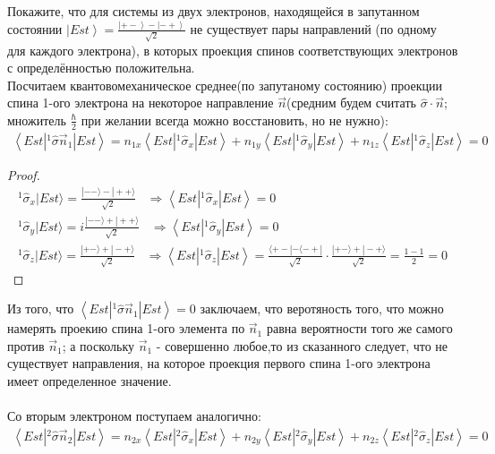 \documentclass[__main__.tex]{subfiles}
\begin{document}
	
	Покажите, что для системы из двух электронов, находящейся в запутанном состоянии $\left|Est\right>=\frac{\left|+-\right>-\left|-+\right>}{\sqrt{2}}$ не существует пары направлений (по одному для каждого электрона), в которых проекция спинов соответствующих электронов с определённостью положительна.\\
	
	Посчитаем квантовомеханическое среднее(по запутаному состоянию) проекции спина 1-ого электрона на некоторое направление $\vec{n}$(средним будем считать $\hat{\sigma}\cdot\vec{n}$; множитель $\frac{\hbar}{2}$ при желании всегда можно восстановить, но не нужно):
	\begin{gather*}
		\left<Est|^1\hat{\sigma}\vec{n}_1|Est\right> = 
			n_{1x}\left<Est|^1\hat{\sigma}_x|Est\right>+
			n_{1y}\left<Est|^1\hat{\sigma}_y|Est\right>+
			n_{1z}\left<Est|^1\hat{\sigma}_z|Est\right> = 0
	\end{gather*}
	\begin{proof}
		\begin{gather*}
			^1\hat{\sigma}_x|Est\rangle = \frac{|--\rangle-|++\rangle}{\sqrt{2}}\;\;\;\Rightarrow \left<Est|^1\hat{\sigma}_x|Est\right> = 0\\
			^1\hat{\sigma}_y|Est\rangle = i\frac{|--\rangle+|++\rangle}{\sqrt{2}}\;\;\;\Rightarrow \left<Est|^1\hat{\sigma}_y|Est\right> = 0\\
			^1\hat{\sigma}_z|Est\rangle = \frac{|+-\rangle+|-+\rangle}{\sqrt{2}}\;\;\;\Rightarrow \left<Est|^1\hat{\sigma}_z|Est\right> = \frac{\langle+-|-\langle-+|}{\sqrt{2}}\cdot \frac{|+-\rangle+|-+\rangle}{\sqrt{2}} = \frac{1-1}{2} =  0
		\end{gather*}
	\end{proof}
	Из того, что $\left<Est|^1\hat{\sigma}\vec{n}_1|Est\right> = 0$ заключаем, что веротяность того, что можно намерять проекию спина 1-ого элемента по $\vec{n}_1$ равна вероятности того же самого против $\vec{n}_1$; а поскольку $\vec{n}_1$ - совершенно любое,то из сказанного следует, что не существует направления, на которое проекция первого спина 1-ого электрона имеет определенное значение.\\\\
	Со вторым электроном поступаем аналогично:
	\begin{gather*}
		\left<Est|^2\hat{\sigma}\vec{n}_2|Est\right> = 
		n_{2x}\left<Est|^2\hat{\sigma}_x|Est\right>+
		n_{2y}\left<Est|^2\hat{\sigma}_y|Est\right>+
		n_{2z}\left<Est|^2\hat{\sigma}_z|Est\right> = 0
	\end{gather*}
\end{document}
